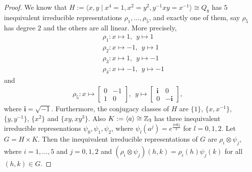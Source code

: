 \documentclass{amsart}
\begin{document}
\begin{proof}
	We know that $H:=\langle x,y\mid x^4=1, x^2=y^2, y^{-1}xy=x^{-1}\rangle\cong Q_8$ has $5$ inequivalent irreducible representations $\rho_1,\ldots,\rho_5$, and exactly one of them, say $\rho_5$ has degree $2$ and the others are all linear. More precisely, 
	\begin{eqnarray*}
		&&\rho_1:x\mapsto 1,~~y\mapsto 1\\
		&&\rho_2: x\mapsto -1,~~y\mapsto 1\\
		&&\rho_3: x\mapsto 1,~~y\mapsto -1\\
		&&\rho_4: x\mapsto -1,~~y\mapsto -1
	\end{eqnarray*}
	and 
	\begin{eqnarray*}
		\rho_5:x\mapsto\begin{bmatrix}
			0&-1\\
			1&0
		\end{bmatrix},~~y\mapsto\begin{bmatrix}
			\textbf{i}&0\\
			0&-\textbf{i}
		\end{bmatrix},
	\end{eqnarray*}
	where $\textbf{i}=\sqrt{-1}$. Furthermore, the conjugacy classes of $H$ are $\{1\}$, $\{x,x^{-1}\}$, $\{y,y^{-1}\}$, $\{x^2\}$ and $\{xy,xy^3\}$. Also $K:=\langle a\rangle\cong \Bbb Z_3$ has three inequivalent irreducible represenations $\psi_0,\psi_1,\psi_2$, where $\psi_l(a^j)=e^{\frac{2\pi \textbf{i}lj}{3}}$   for $l=0,1,2$. Let $G=H\times K$. Then the inequivalent irreducible representations of $G$ are
	$\rho_i\otimes\psi_j$, where $i=1,\ldots,5$ and $j=0,1,2$ and $(\rho_i\otimes\psi_j)(h,k)=\rho_i(h)\psi_j(k)$ for all $(h,k)\in G$.
	

\end{proof}
\end{document}
